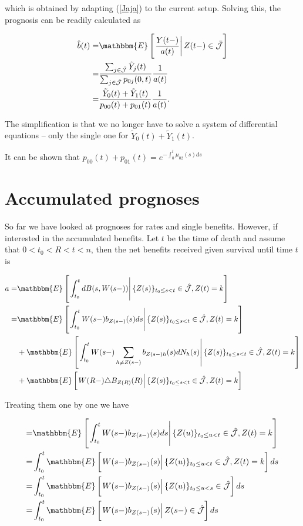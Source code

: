 \documentclass{book}
\newcommand{\1}[1]{\mathbbm{1}_{\left\lbrace #1 \right\rbrace}}
\newcommand{\econd}[2][def]{\mathbbm{E} \left[ \left. #1 \right| #2 \right]}
\theoremstyle{break}
\theoremstyle{remark}
\newenvironment{remark}
  {\pushQED{\qed}\renewcommand{\qedsymbol}{\scalebox{1.4}{$\circ$}}\remarkx}
  {\popQED\endremarkx}
\numberwithin{equation}{section}
\begin{document}
which is obtained by adapting (\ref{Jaja}) to the current setup. Solving this, the prognosis can be readily calculated as

\begin{align*}
	\hat{b}(t) =& \econd[\frac{Y(t-)}{a(t)}]{Z(t-) \in \bar{\mathcal{J}}} \\
	=&\frac{\sum_{j \in \hat{\mathcal{J}}} \tilde{Y}_j(t)}{\sum_{j \in \hat{\mathcal{J}}} p_{0j}(0,t)} \frac{1}{a(t)} \\
	=&\frac{\tilde{Y}_0(t) + \tilde{Y}_1(t)}{p_{00}(t) + p_{01}(t)} \frac{1}{a(t)}.
\end{align*}

The simplification is that we no longer have to solve a system of differential equations -- only the single one for $\tilde{Y}_0(t) + \tilde{Y}_1(t)$.

\begin{remark}
	It can be shown that $p_{00}(t) + p_{01}(t) = e^{-\int_0^t \mu_{02}(s)ds}$
\end{remark}

\chapter{Accumulated prognoses}

So far we have looked at prognoses for rates and single benefits. However, if interested in the accumulated benefits. Let $t$ be the time of death and assume that $0<t_0<R<t<n$, then the net benefits received given survival until time $t$ is

\begin{align*}
	a =& \econd[\int_{t_0}^t dB(s,W(s-))]{ \{ Z(s) \}_{t_0 \leq s < t} \in \hat{\mathcal{J}}, Z(t) = k} \\
	=& \econd[\int_{t_0}^t W(s-) b_{Z(s-)}(s) ds]{ \{ Z(s) \}_{t_0 \leq s < t} \in \hat{\mathcal{J}}, Z(t) = k} \\
	&+ \econd[\int_{t_0}^t W(s-) \sum_{h \neq Z(s-)} b_{Z(s-)h}(s) dN_h(s)]{ \{ Z(s) \}_{t_0 \leq s < t} \in \hat{\mathcal{J}}, Z(t) = k} \\
	&+ \econd[W(R-) \triangle B_{Z(R)}(R)]{ \{ Z(s) \}_{t_0 \leq s < t} \in \hat{\mathcal{J}}, Z(t) = k} \\
\end{align*}

Treating them one by one we have

\begin{align*}
	=& \econd[\int_{t_0}^t W(s-) b_{Z(s-)}(s) ds]{ \{ Z(u) \}_{t_0 \leq u < t} \in \hat{\mathcal{J}}, Z(t) = k} \\
	=& \int_{t_0}^t \econd[ W(s-) b_{Z(s-)}(s)]{ \{ Z(u) \}_{t_0 \leq u < t} \in \hat{\mathcal{J}}, Z(t) = k} ds \\
	=& \int_{t_0}^t \econd[ W(s-) b_{Z(s-)}(s)]{ \{ Z(u) \}_{t_0 \leq u < s} \in \hat{\mathcal{J}}} ds \\
	=& \int_{t_0}^t \econd[ W(s-) b_{Z(s-)}(s)]{ Z(s-) \in \hat{\mathcal{J}}} ds \\
\end{align*}
\end{document}
